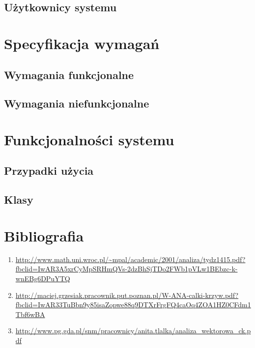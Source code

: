 \documentclass[a4paper,12pt]{article}
\begin{document}
\subsection{Użytkownicy systemu}



\section{Specyfikacja wymagań}

\subsection{Wymagania funkcjonalne}

\subsection{Wymagania niefunkcjonalne}



\section{Funkcjonalności systemu}

\subsection{Przypadki użycia}

\subsection{Klasy}


\section*{Bibliografia}
\begin{enumerate}
\item \url{http://www.math.uni.wroc.pl/~mpal/academic/2001/analiza/tydz1415.pdf?fbclid=IwAR3A5xrCyMpSRHmQVs-2dzBhSjTDo2FWb1pVLw1BEbzc-k-wnEBg6DPuYTQ}
\item \url{http://maciej.grzesiak.pracownik.put.poznan.pl/W-ANA-calki-krzyw.pdf?fbclid=IwAR33TuBbn9y85isaZopwe88q9DTXrFrgFQ4caOq4ZOA1HZ0CFdm1Tbf6wBA}
\item \url{http://www.pg.gda.pl/snm/pracownicy/anita.tlalka/analiza_wektorowa_ck.pdf}
\end{enumerate}
\end{document}
